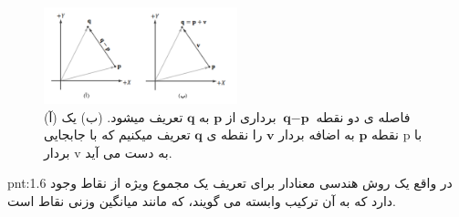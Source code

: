 {\begin{spacing}{1.5}
        \begin{figure}[H]
            \centering
            \setlength{\belowcaptionskip}{-10pt}
            \includegraphics[width=0.5\textwidth]{Images/4/1/4.Session.1.1.17}
            \caption {(آ) فاصله ی دو نقطه $\textbf{q}-\textbf{p}$ برداری از $\textbf{p}$ به $\textbf{q}$ تعریف میشود. (ب) یک نقطه $\textbf{p}$ به اضافه بردار $\textbf{v}$ را نقطه ی $\textbf{q}$ تعریف میکنیم که با جابجایی p با بردار v به دست می آید.}
            \label{fig:4.Session.1.1.17}
        \end{figure}

        \begin{point}{pnt:1.6}
            \Large
            در واقع یک روش هندسی معنادار برای تعریف یک مجموع ویژه از نقاط وجود دارد که به آن ترکیب وابسته می گویند، که مانند میانگین وزنی نقاط است.
        \end{point}
    \end{spacing}
}


